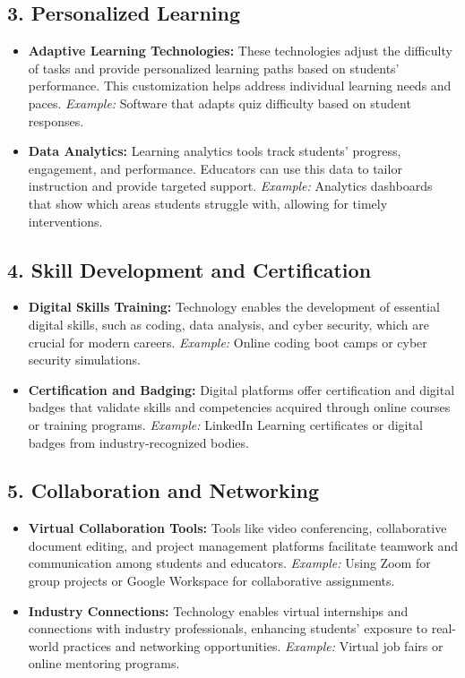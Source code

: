 \documentclass[10pt]{article}
\begin{document}
\subsection*{3. Personalized Learning}
\begin{itemize}
    \item \textbf{Adaptive Learning Technologies:} These technologies adjust the difficulty of tasks and provide personalized learning paths based on students' performance. This customization helps address individual learning needs and paces. \textit{Example:} Software that adapts quiz difficulty based on student responses.
    \item \textbf{Data Analytics:} Learning analytics tools track students' progress, engagement, and performance. Educators can use this data to tailor instruction and provide targeted support. \textit{Example:} Analytics dashboards that show which areas students struggle with, allowing for timely interventions.
\end{itemize}

\subsection*{4. Skill Development and Certification}
\begin{itemize}
    \item \textbf{Digital Skills Training:} Technology enables the development of essential digital skills, such as coding, data analysis, and cyber security, which are crucial for modern careers. \textit{Example:} Online coding boot camps or cyber security simulations.
    \item \textbf{Certification and Badging:} Digital platforms offer certification and digital badges that validate skills and competencies acquired through online courses or training programs. \textit{Example:} LinkedIn Learning certificates or digital badges from industry-recognized bodies.
\end{itemize}

\subsection*{5. Collaboration and Networking}
\begin{itemize}
    \item \textbf{Virtual Collaboration Tools:} Tools like video conferencing, collaborative document editing, and project management platforms facilitate teamwork and communication among students and educators. \textit{Example:} Using Zoom for group projects or Google Workspace for collaborative assignments.
    \item \textbf{Industry Connections:} Technology enables virtual internships and connections with industry professionals, enhancing students' exposure to real-world practices and networking opportunities. \textit{Example:} Virtual job fairs or online mentoring programs.
\end{itemize}
\end{document}
